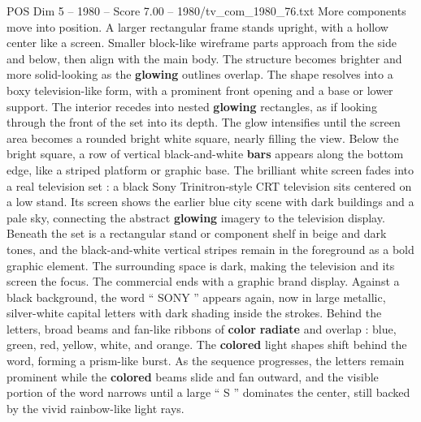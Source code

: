 \begin{textsample}{POS Dim 5 – 1980 – Score 7.00 – 1980/tv\_com\_1980\_76.txt}
More components move into position.
A larger rectangular frame stands upright, with a hollow center like a screen.
Smaller block-like wireframe parts approach from the side and below, then align with the main body.
The structure becomes brighter and more solid-looking as the \textbf{glowing} outlines overlap.
The shape resolves into a boxy television-like form, with a prominent front opening and a base or lower support.
The interior recedes into nested \textbf{glowing} rectangles, as if looking through the front of the set into its depth.
The glow intensifies until the screen area becomes a rounded bright white square, nearly filling the view.
Below the bright square, a row of vertical black-and-white \textbf{bars} appears along the bottom edge, like a striped platform or graphic base.
The brilliant white screen fades into a real television set : a black Sony Trinitron-style CRT television sits centered on a low stand.
Its screen shows the earlier blue city scene with dark buildings and a pale sky, connecting the abstract \textbf{glowing} imagery to the television display.
Beneath the set is a rectangular stand or component shelf in beige and dark tones, and the black-and-white vertical stripes remain in the foreground as a bold graphic element.
The surrounding space is dark, making the television and its screen the focus.
The commercial ends with a graphic brand display.
Against a black background, the word “ SONY ” appears again, now in large metallic, silver-white capital letters with dark shading inside the strokes.
Behind the letters, broad beams and fan-like ribbons of \textbf{color} \textbf{radiate} and overlap : blue, green, red, yellow, white, and orange.
The \textbf{colored} light shapes shift behind the word, forming a prism-like burst.
As the sequence progresses, the letters remain prominent while the \textbf{colored} beams slide and fan outward, and the visible portion of the word narrows until a large “ S ” dominates the center, still backed by the vivid rainbow-like light rays.

\end{textsample}
